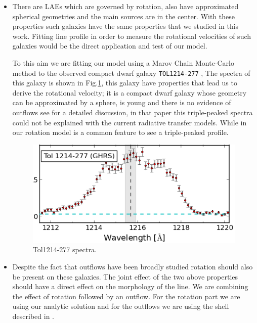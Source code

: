 \begin{itemize}


\item There are LAEs which are governed by rotation, also 
have approximated spherical geometries and the main \ly sources are in the center. 
With these properties such galaxies have the same properties 
that we studied in this work.  
Fitting \ly line profile in order  to measure the rotational 
velocities of such galaxies would be the direct application 
and test of our model. 

To this aim we are fitting our model using a Marov Chain Monte-Carlo 
method to the observed compact dwarf galaxy \verb+TOL1214-277+\citep{Thuan97, Verhamme15}
, The spectra of this galaxy is shown in Fig.\ref{fig:tol}, 
this galaxy have properties that lead us to derive the rotational 
velocity; it is a compact dwarf galaxy whose geometry can be approximated by a sphere, 
is young and there is no evidence of outflows see \citep{Verhamme15} for a detailed
discussion, in that paper this triple-peaked spectra could not be explained
with the current radiative transfer models. While in our rotation 
model is a common feature to see a triple-peaked profile. 

\begin{figure} 
\begin{center}
\includegraphics[scale=0.6]{Figures/tol.png}
\end{center}\caption{Tol1214-277 spectra.\label{fig:tol}} 
\end{figure}

\item Despite the fact that outflows have been broadly studied rotation should 
also be present on these galaxies. The joint effect of the two above properties 
should have a direct effect on the morphology of the \lya line. We are 
 combining the effect of rotation followed by an outflow. For the rotation
part we are using our analytic solution and for the outflows
we are using the shell described in \citep{Verhamme12}. 
\end{itemize}
